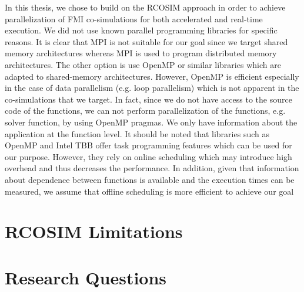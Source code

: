 In this thesis, we chose to build on the RCOSIM approach in order to achieve parallelization of FMI co-simulations for both accelerated and real-time execution. We did not use known parallel programming libraries for specific reasons. It is clear that MPI is not suitable for our goal since we target shared memory architectures whereas MPI is used to program distributed memory architectures. The other option is use OpenMP or similar libraries which are adapted to shared-memory architectures. However, OpenMP is efficient especially in the case of data parallelism (e.g. loop parallelism) which is not apparent in the co-simulations that we target. In fact, since we do not have access to the source code of the functions, we can not perform parallelization of the functions, e.g. solver function, by using OpenMP pragmas. We only have information about the application at the function level. It should be noted that libraries such as OpenMP and Intel TBB offer task programming features which can be used for our purpose. However, they rely on online scheduling which may introduce high overhead and thus decreases the performance. In addition, given that information about dependence between functions is available and the execution times can be measured, we assume that offline scheduling is more efficient to achieve our goal   

\section{RCOSIM Limitations}

\section{Research Questions}